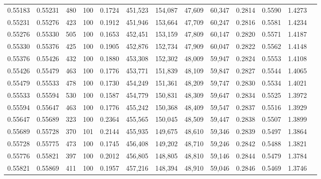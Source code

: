 \begin{tabular}{rrrrrrrrrrrrr}
0.55183 & 0.55231 &   480 & 100 &                                     0.1724 & 451,523 & 154,087 &  47,609 &  60,347 & 0.2814 & 0.5590 & 1.4273 \\
0.55231 & 0.55276 &   423 & 100 &                                     0.1912 & 451,946 & 153,664 &  47,709 &  60,247 & 0.2816 & 0.5581 & 1.4234 \\
0.55276 & 0.55330 &   505 & 100 &                                     0.1653 & 452,451 & 153,159 &  47,809 &  60,147 & 0.2820 & 0.5571 & 1.4187 \\
0.55330 & 0.55376 &   425 & 100 &                                     0.1905 & 452,876 & 152,734 &  47,909 &  60,047 & 0.2822 & 0.5562 & 1.4148 \\
0.55376 & 0.55426 &   432 & 100 &                                     0.1880 & 453,308 & 152,302 &  48,009 &  59,947 & 0.2824 & 0.5553 & 1.4108 \\
0.55426 & 0.55479 &   463 & 100 &                                     0.1776 & 453,771 & 151,839 &  48,109 &  59,847 & 0.2827 & 0.5544 & 1.4065 \\
0.55479 & 0.55533 &   478 & 100 &                                     0.1730 & 454,249 & 151,361 &  48,209 &  59,747 & 0.2830 & 0.5534 & 1.4021 \\
0.55533 & 0.55594 &   530 & 100 &                                     0.1587 & 454,779 & 150,831 &  48,309 &  59,647 & 0.2834 & 0.5525 & 1.3972 \\
0.55594 & 0.55647 &   463 & 100 &                                     0.1776 & 455,242 & 150,368 &  48,409 &  59,547 & 0.2837 & 0.5516 & 1.3929 \\
0.55647 & 0.55689 &   323 & 100 &                                     0.2364 & 455,565 & 150,045 &  48,509 &  59,447 & 0.2838 & 0.5507 & 1.3899 \\
0.55689 & 0.55728 &   370 & 101 &                                     0.2144 & 455,935 & 149,675 &  48,610 &  59,346 & 0.2839 & 0.5497 & 1.3864 \\
0.55728 & 0.55775 &   473 & 100 &                                     0.1745 & 456,408 & 149,202 &  48,710 &  59,246 & 0.2842 & 0.5488 & 1.3821 \\
0.55776 & 0.55821 &   397 & 100 &                                     0.2012 & 456,805 & 148,805 &  48,810 &  59,146 & 0.2844 & 0.5479 & 1.3784 \\
0.55821 & 0.55869 &   411 & 100 &                                     0.1957 & 457,216 & 148,394 &  48,910 &  59,046 & 0.2846 & 0.5469 & 1.3746 \\

\end{tabular}
